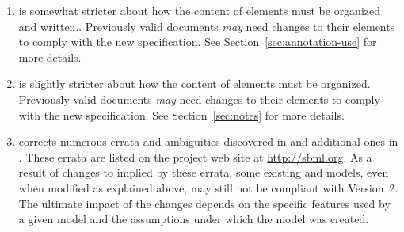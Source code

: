 \begin{blockChanged}
\begin{enumerate}
\item \sbmltwothree is somewhat stricter about how the content of
   elements must be organized and written..
  Previously valid \sbmltwoone documents \emph{may} need changes
  to their  elements to comply with the new
  specification.  See Section~\ref{sec:annotation-use} for more
  details.
  
\item \sbmltwothree is slightly stricter about how the content of
   elements must be organized.  Previously valid
  \sbmltwoone documents \emph{may} need changes to their
   elements to comply with the new specification.
  See Section~\ref{sec:notes} for more details.
  
\item \sbmltwothree corrects numerous errata and ambiguities
  discovered in \sbmltwoone and additional ones in \sbmltwotwo.
  These errata are listed on the project web site at
  \url{http://sbml.org}.  As a result of changes to \sbmltwo
  implied by these errata, some existing \sbmltwoone and
  \sbmltwotwo models, even when modified as explained above, may
  still not be compliant with Version~2.  The ultimate impact of
  the changes depends on the specific features used by a given
  model and the assumptions under which the model was created.

\end{enumerate}


\end{blockChanged}
